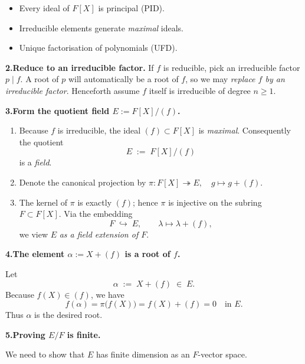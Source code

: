 \documentclass[12pt]{article}
\theoremstyle{definition} %
\theoremstyle{plain} %
\begin{document}
\begin{itemize}
\item Every ideal of \(F[X]\) is principal (PID).
\item Irreducible elements generate \emph{maximal} ideals.
\item Unique factorisation of polynomials (UFD).
\end{itemize}

\medskip
\textbf{2.\;Reduce to an irreducible factor.}
If \(f\) is reducible, pick an irreducible factor \(p\mid f\).
A root of \(p\) will automatically be a root of \(f\), so we may
\emph{replace \(f\) by an irreducible factor}.
Henceforth assume \(f\) itself is irreducible of degree
\(n\ge1\).

\medskip
\textbf{3.\;Form the quotient field \(E:=F[X]/(f)\).}

\begin{enumerate}[label=\alph*)]
\item Because \(f\) is irreducible, the ideal \((f)\subset F[X]\)
      is \emph{maximal}.  
      Consequently the quotient
      \[
          E\;:=\;F[X]\bigl/(f)
      \]
      is a \emph{field}.
\item Denote the canonical projection by
      \(
          \pi:F[X]\twoheadrightarrow E,\quad
          g\mapsto g+(f).
      \)
\item The kernel of \(\pi\) is exactly \((f)\); hence \(\pi\) is
      injective on the subring \(F\subset F[X]\).
      Via the embedding
      \[
           F \;\hookrightarrow\;E,\qquad
           \lambda\longmapsto\lambda+(f),
      \]
      we view \(E\) \emph{as a field extension of \(F\)}.
\end{enumerate}

\medskip
\textbf{4.\;The element \(\alpha:=X+(f)\) is a root of \(f\).}

Let
\[
     \alpha\;:=\;X+(f)\;\in\;E.
\]
Because \(f(X)\in(f)\), we have
\[
     f(\alpha)=\pi\!\bigl(f(X)\bigr)=f(X)+(f)=0\quad\text{in }E.
\]
Thus \(\alpha\) is the desired root.

\medskip
\textbf{5.\;Proving \(E/F\) is finite.}

We need to show that \(E\) has finite dimension as an \(F\)-vector
space.
\end{document}
